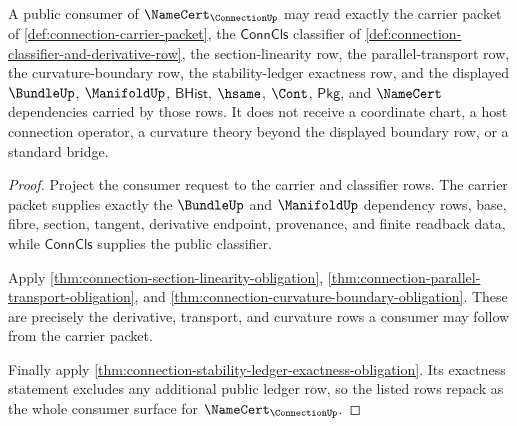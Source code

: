 \begin{theorem}
\label{thm:connection-public-certificate-consumer-surface}
A public consumer of $\NameCert_{\ConnectionUp}$ may read exactly the carrier
packet of \autoref{def:connection-carrier-packet}, the $\mathsf{ConnCls}$
classifier of \autoref{def:connection-classifier-and-derivative-row}, the
section-linearity row, the parallel-transport row, the curvature-boundary row,
the stability-ledger exactness row, and the displayed $\BundleUp$,
$\ManifoldUp$, $\mathsf{BHist}$, $\hsame$, $\Cont$, $\mathsf{Pkg}$, and
$\NameCert$ dependencies carried by those rows. It does not receive a
coordinate chart, a host connection operator, a curvature theory beyond the
displayed boundary row, or a standard bridge.
\end{theorem}
\begin{proof}
Project the consumer request to the carrier and classifier rows. The carrier
packet supplies exactly the $\BundleUp$ and $\ManifoldUp$ dependency rows,
base, fibre, section, tangent, derivative endpoint, provenance, and finite
readback data, while $\mathsf{ConnCls}$ supplies the public classifier.

Apply \autoref{thm:connection-section-linearity-obligation},
\autoref{thm:connection-parallel-transport-obligation}, and
\autoref{thm:connection-curvature-boundary-obligation}. These are precisely
the derivative, transport, and curvature rows a consumer may follow from the
carrier packet.

Finally apply \autoref{thm:connection-stability-ledger-exactness-obligation}.
Its exactness statement excludes any additional public ledger row, so the
listed rows repack as the whole consumer surface for
$\NameCert_{\ConnectionUp}$.
\end{proof}

